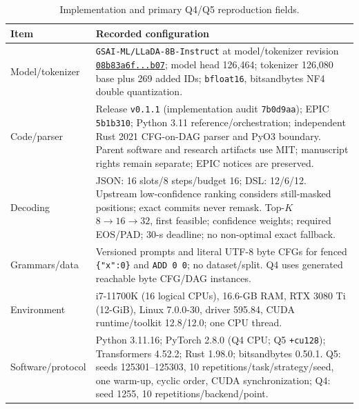 

\begin{table}[ht]
\centering
\caption{Implementation and primary Q4/Q5 reproduction fields.}
\label{tab:config}
\scriptsize
\begin{tabular}{p{2.25cm}p{8.95cm}}
\toprule
Item & Recorded configuration \\ \midrule
Model/tokenizer & \texttt{GSAI-ML/LLaDA-8B-Instruct} at model/tokenizer revision \href{https://huggingface.co/GSAI-ML/LLaDA-8B-Instruct/tree/08b83a6feb34df1a6011b80c3c00c7563e963b07}{\texttt{08b83a6f...b07}}; model head 126,464; tokenizer 126,080 base plus 269 added IDs; \texttt{bfloat16}, bitsandbytes NF4 double quantization. \\
Code/parser & Release \texttt{v0.1.1} (implementation audit \texttt{7b0d9aa}); EPIC \texttt{5b1b310}; Python 3.11 reference/orchestration; independent Rust 2021 CFG-on-DAG parser and PyO3 boundary. Parent software and research artifacts use MIT; manuscript rights remain separate; EPIC notices are preserved. \\
Decoding & JSON: 16 slots/8 steps/budget 16; DSL: 12/6/12. Upstream low-confidence ranking considers still-masked positions; exact commits never remask. Top-$K$ $8\rightarrow16\rightarrow32$, first feasible; confidence weights; required EOS/PAD; 30-s deadline; no non-optimal exact fallback. \\
Grammars/data & Versioned prompts and literal UTF-8 byte CFGs for fenced \texttt{\{"x":0\}} and \texttt{ADD 0 0}; no dataset/split. Q4 uses generated reachable byte CFG/DAG instances. \\
Environment & i7-11700K (16 logical CPUs), 16.6-GB RAM, RTX 3080 Ti (12-GiB), Linux 7.0.0-30, driver 595.84, CUDA runtime/toolkit 12.8/12.0; one CPU thread. \\
Software/protocol & Python 3.11.16; PyTorch 2.8.0 (Q4 CPU; Q5 \texttt{+cu128}); Transformers 4.52.2; Rust 1.98.0; bitsandbytes 0.50.1. Q5: seeds 125301--125303, 10 repetitions/task/strategy/seed, one warm-up, cyclic order, CUDA synchronization; Q4: seed 1255, 10 repetitions/backend/point. \\
\bottomrule
\end{tabular}
\end{table}

